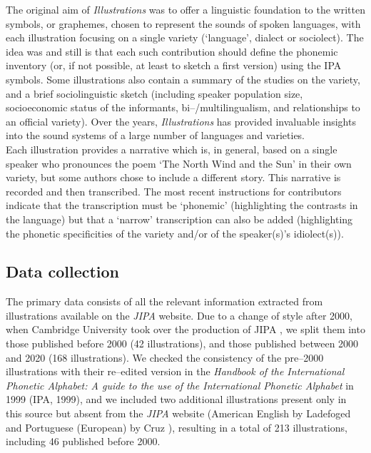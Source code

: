 The original aim of \textit{Illustrations} was to offer a linguistic foundation to the written symbols, or graphemes, chosen to represent the sounds of spoken languages, with each illustration focusing on a single variety (‘language’, dialect or sociolect). The idea was and still is that each such contribution should define the phonemic inventory (or, if not possible, at least to sketch a first version) using the IPA symbols. Some illustrations also contain a summary of the studies on the variety, and a brief sociolinguistic sketch (including speaker population size, socioeconomic status of the informants, bi–/multilingualism, and relationships to an official variety). Over the years, \textit{Illustrations} has provided invaluable insights into the sound systems of a large number of languages and varieties. \\

Each illustration provides a narrative which is, in general, based on a single speaker who pronounces the poem ‘The North Wind and the Sun’ in their own variety, but some authors chose to include a different story. This narrative is recorded and then transcribed. The most recent instructions for contributors \parencite{ipaInstructionsContributors2021} indicate that the transcription must be ‘phonemic’ (highlighting the contrasts in the language) but that a ‘narrow’ transcription can also be added (highlighting the phonetic specificities of the variety and/or of the speaker(s)’s idiolect(s)).

\subsection{Data collection}\label{subsec:data_coll}

The primary data consists of all the relevant information extracted from illustrations available on the \textit{JIPA} website. Due to a change of style after 2000, when Cambridge University took over the production of JIPA \parencite{ipaPublicationJournalInternational2000}, we split them into those published before 2000 (42 illustrations), and those published between 2000 and 2020 (168 illustrations). We checked the consistency of the pre–2000 illustrations with their re–edited version in the \textit{Handbook of the International Phonetic Alphabet: A guide to the use of the International Phonetic Alphabet} in 1999 (IPA, 1999), and we included two additional illustrations present only in this source but absent from the \textit{JIPA} website (American English by Ladefoged \parencite*[41--44]{ipaHandbookInternationalPhonetic1999} and Portuguese (European) by Cruz \parencite*[126--130]{ipaHandbookInternationalPhonetic1999}), resulting in a total of 213 illustrations, including 46 published before 2000.\\

